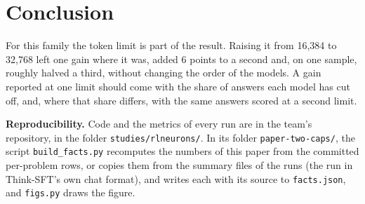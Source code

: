 \documentclass[10pt]{article}
\begin{document}
\section{Conclusion}

For this family the token limit is part of the result. Raising it from 16{,}384 to 32{,}768 left one gain where
it was, added 6 points to a second and, on one sample, roughly halved a third, without changing the order of
the models. A
gain reported at one limit should come with the share of answers each model has cut off, and, where that share
differs, with the same answers scored at a second limit.

{\small
\textbf{Reproducibility.} Code and the metrics of every run are in the team's repository, in the folder
\texttt{studies/rlneurons/}. In its folder \texttt{paper-two-caps/}, the script \texttt{build\_facts.py}
recomputes the numbers of this paper from the committed per-problem rows, or copies them from the summary files of the runs
(the run in Think-SFT's own chat format), and writes each with its source to \texttt{facts.json}, and
\texttt{figs.py} draws the figure.
}

{\small


}
\end{document}
